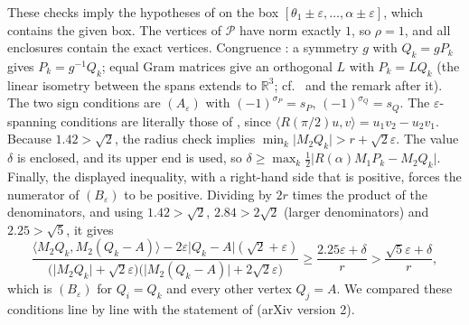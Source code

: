 \documentclass[11pt]{amsart}
\theoremstyle{definition}
\newcommand{\R}{\mathbb{R}}
\newcommand{\ip}[2]{\langle #1,#2\rangle}
\newcommand{\abs}[1]{\lvert #1\rvert}
\newcommand{\RID}{\mathcal{P}}
\begin{document}
These checks imply the hypotheses of \cite[Theorem 36]{SY25} on the box $[\theta_1\pm\varepsilon,\dots,\alpha\pm
\varepsilon]$, which contains the given box. The vertices of $\RID$ have norm exactly $1$, so $\rho=1$, and all
enclosures contain the exact vertices. Congruence \cite[Definition 34]{SY25}: a symmetry $g$ with $Q_k=gP_k$ gives
$P_k=g^{-1}Q_k$; equal Gram matrices give an orthogonal $L$ with $P_k=LQ_k$ (the linear isometry between the spans
extends to $\R^3$; cf.\ \cite[Lemma 35]{SY25} and the remark after it). The two sign conditions are $(A_\varepsilon)$
with $(-1)^{\sigma_P}=s_P$, $(-1)^{\sigma_Q}=s_Q$. The $\varepsilon$-spanning conditions are literally those of
\cite[Definition 27]{SY25}, since $\ip{R(\pi/2)u}{v}=u_1v_2-u_2v_1$. Because $1.42>\sqrt2$, the radius check implies
$\min_k\abs{M_2Q_k}>r+\sqrt2\varepsilon$. The value $\delta$ is enclosed, and its upper end is used, so
$\delta\ge\max_k\frac12\abs{R(\alpha)M_1P_k-M_2Q_k}$. Finally, the displayed inequality, with a right-hand side that is
positive, forces the numerator of $(B_\varepsilon)$ to be positive. Dividing by $2r$ times the product of the
denominators, and using $1.42>\sqrt2$, $2.84>2\sqrt2$ (larger denominators) and $2.25>\sqrt5$, it gives
\[
\frac{\ip{M_2Q_k}{M_2(Q_k-A)}-2\varepsilon\abs{Q_k-A}(\sqrt2+\varepsilon)}
{\bigl(\abs{M_2Q_k}+\sqrt2\varepsilon\bigr)\bigl(\abs{M_2(Q_k-A)}+2\sqrt2\varepsilon\bigr)}
\ge\frac{2.25\varepsilon+\delta}{r}>\frac{\sqrt5\varepsilon+\delta}{r},
\]
which is $(B_\varepsilon)$ for $Q_i=Q_k$ and every other vertex $Q_j=A$. We compared these conditions line by line with
the statement of \cite[Theorem 36]{SY25} (arXiv version 2).
\end{document}
